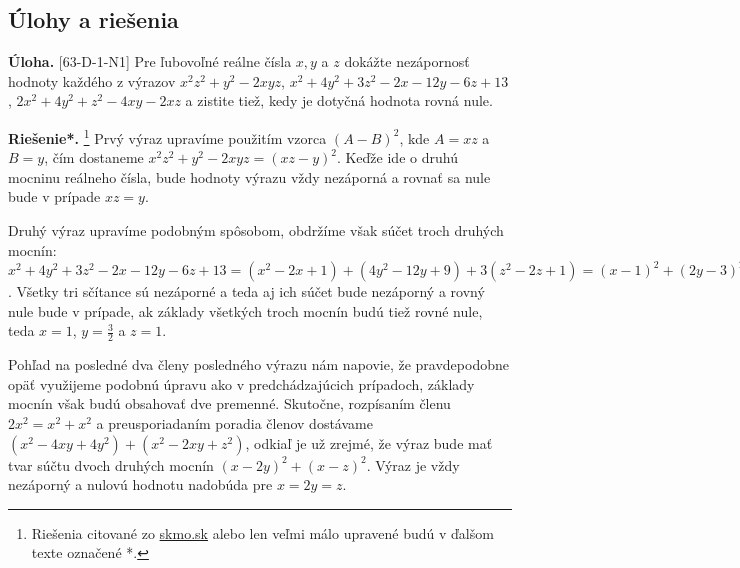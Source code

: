 \documentclass[11pt,a4paper,oneside,final]{book}
\newcommand{\ul}{\textbf{Úloha.} }
\newcommand{\rieh}{\textbf{Riešenie*.} }
\begin{document}
\subsection*{Úlohy a riešenia}
\begin{tcolorbox}[breakable,notitle,boxrule=0pt,colback=light-gray,colframe=light-gray]\ul [63-D-1-N1] Pre ľubovoľné reálne čísla $x, y$ a $z$ dokážte nezápornosť hodnoty každého z výrazov $x^2z^2+ y^2- 2xyz$, $x^2+ 4y^2+ 3z^2- 2x - 12y - 6z + 13$, $2x^2+ 4y^2 + z^2- 4xy - 2xz$ a zistite tiež, kedy je dotyčná hodnota rovná nule.


\end{tcolorbox}

\rieh \footnote{Riešenia citované zo \url{skmo.sk} alebo len veľmi málo upravené budú v ďalšom texte označené *.} Prvý výraz upravíme použitím vzorca $(A-B)^2$, kde $A=xz$ a $B=y$, čím dostaneme $x^2z^2+ y^2- 2xyz=(xz-y)^2$. Keďže ide o druhú mocninu reálneho čísla, bude hodnoty výrazu vždy nezáporná a rovnať sa nule bude v prípade $xz=y$.

Druhý výraz upravíme podobným spôsobom, obdržíme však súčet troch druhých mocnín: $x^2+ 4y^2+ 3z^2- 2x - 12y - 6z + 13= (x^2-2x+1)+(4y^2-12y+9)+3(z^2-2z+1)=(x-1)^2+(2y-3)^2+3(z-1)^2$. Všetky tri sčítance sú nezáporné a teda aj ich súčet bude nezáporný a rovný nule bude v prípade, ak základy všetkých troch mocnín budú tiež rovné nule, teda $x=1$, $y=\frac{3}{2}$ a $z=1$.

Pohľad na posledné dva členy posledného výrazu nám napovie, že pravdepodobne opäť využijeme podobnú úpravu ako v predchádzajúcich prípadoch, základy mocnín však budú obsahovať dve premenné. Skutočne, rozpísaním členu $2x^2=x^2+x^2$ a preusporiadaním poradia členov dostávame $(x^2-4xy+4y^2)+(x^2-2xy+z^2)$, odkiaľ je už zrejmé, že výraz bude mať tvar súčtu dvoch druhých mocnín $(x-2y)^2+(x-z)^2$. Výraz je vždy nezáporný a nulovú hodnotu nadobúda pre $x=2y=z$.\\
\end{document}
